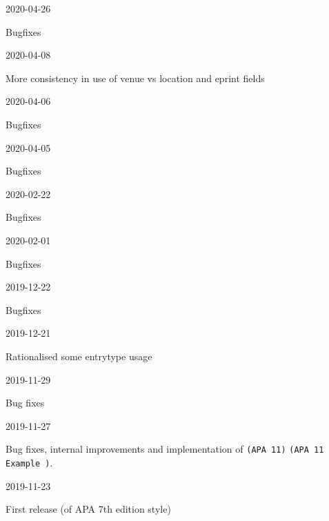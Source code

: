 \documentclass{ltxdockit}
\newcommand\apa[2][]{\ifthenelse{\equal{#1}{}}%
                       {\texttt{(APA #2)}}%
                       {\texttt{(APA #2 Example #1)}}}
\begin{document}
\begin{changelog}
\begin{release}{9.10}{2020-04-26}
\item Bugfixes
\end{release}

\begin{release}{9.9}{2020-04-08}
\item More consistency in use of venue vs location and eprint fields
\end{release}

\begin{release}{9.8}{2020-04-06}
\item Bugfixes
\end{release}

\begin{release}{9.7}{2020-04-05}
\item Bugfixes
\end{release}

\begin{release}{9.6}{2020-02-22}
\item Bugfixes
\end{release}

\begin{release}{9.5}{2020-02-01}
\item Bugfixes
\end{release}

\begin{release}{9.4}{2019-12-22}
\item Bugfixes
\end{release}

\begin{release}{9.3}{2019-12-21}
\item Rationalised some entrytype usage
\end{release}

\begin{release}{9.2}{2019-11-29}
\item Bug fixes
\end{release}
  
\begin{release}{9.1}{2019-11-27}
\item Bug fixes, internal improvements and implementation of \apa{11}.
\end{release}

\begin{release}{9.0}{2019-11-23}
\item First release (of APA 7th edition style)
\end{release}

\end{changelog}
\end{document}
